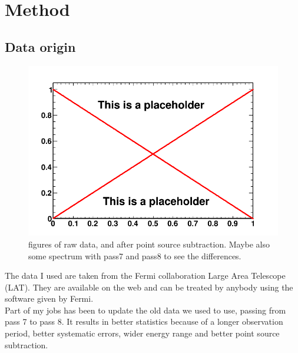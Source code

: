 \chapter{Method}
\label{ch:method}

\section{Data origin}
\label{sec:Data_origin}

\begin{figure}
 \centering
 \includegraphics[width=.9\linewidth]{pic/dummy.png}
 \caption{figures of raw data, and after point source subtraction. Maybe also some spectrum with pass7 and pass8 to see the differences.}
 \label{fig:method_pass8}
\end{figure}

The data I used are taken from the Fermi collaboration Large Area Telescope (LAT). They are available on the web and can be treated by anybody using the software given by Fermi.\\

Part of my jobs has been to update the old data we used to use, passing from pass 7 to pass 8. It results in better statistics because of a longer observation period, better systematic errors, wider energy range and better point source subtraction.\\

